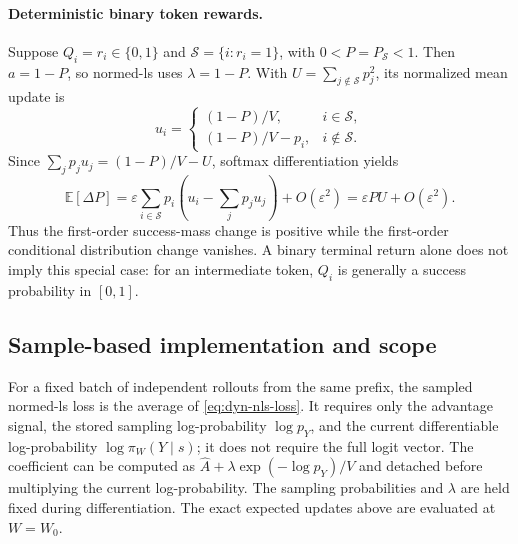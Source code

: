 \paragraph{Deterministic binary token rewards.}
Suppose $Q_i=r_i\in\{0,1\}$ and
$\mathcal S=\{i:r_i=1\}$, with $0<P=P_{\mathcal S}<1$.
Then $a=1-P$, so normed-ls uses $\lambda=1-P$. With
$U=\sum_{j\notin\mathcal S}p_j^2$, its normalized mean update is
\[
 u_i=\begin{cases}
 (1-P)/V,&i\in\mathcal S,\\
 (1-P)/V-p_i,&i\notin\mathcal S.
 \end{cases}
\]
Since $\sum_jp_ju_j=(1-P)/V-U$, softmax differentiation yields
\begin{equation}
 \mathbb E[\Delta P]
 =\varepsilon\sum_{i\in\mathcal S}p_i
       \left(u_i-\sum_jp_ju_j\right)+O(\varepsilon^2)
 =\varepsilon PU+O(\varepsilon^2).
 \label{eq:dyn-nls-success}
\end{equation}
Thus the first-order success-mass change is positive while the
first-order conditional distribution change vanishes. A binary terminal
return alone does not imply this special case: for an intermediate token,
$Q_i$ is generally a success probability in $[0,1]$.

\subsection{Sample-based implementation and scope}
\label{app:dynamics-implementation}

For a fixed batch of independent rollouts from the same prefix, the
sampled normed-ls loss is the average of
\eqref{eq:dyn-nls-loss}. It requires only the advantage signal, the
stored sampling log-probability $\log p_Y$, and the current differentiable
log-probability $\log\pi_W(Y\mid s)$; it does not require the full
logit vector. The coefficient can be computed as
$\widehat A+\lambda\exp(-\log p_Y)/V$ and detached before multiplying
the current log-probability. The sampling probabilities and $\lambda$
are held fixed during differentiation. The exact expected updates above
are evaluated at $W=W_0$.

